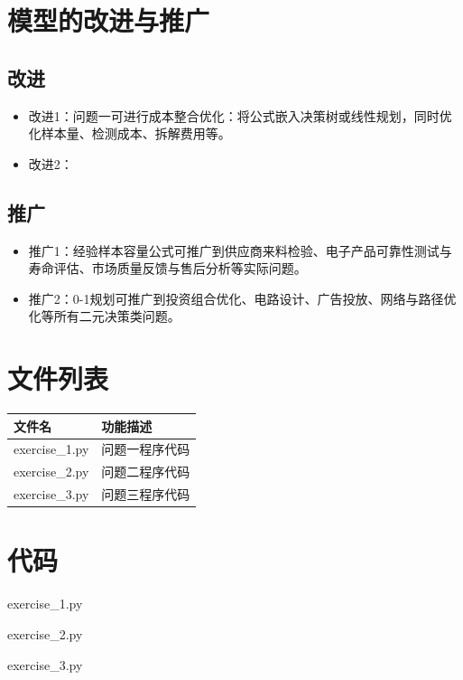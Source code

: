 \documentclass[withoutpreface,bwprint]{cumcmthesis}
\begin{document}
\section{模型的改进与推广}

\subsection{改进}
\begin{itemize}[itemindent=2em]
   \item 改进1：问题一可进行成本整合优化：将公式嵌入决策树或线性规划，同时优化样本量、检测成本、拆解费用等。
   \item 改进2：
\end{itemize}


\subsection{推广}
\begin{itemize}[itemindent=2em]
    \item 推广1：经验样本容量公式可推广到供应商来料检验、电子产品可靠性测试与寿命评估、市场质量反馈与售后分析等实际问题。
   \item 推广2：0-1规划可推广到投资组合优化、电路设计、广告投放、网络与路径优化等所有二元决策类问题。
\end{itemize}
\newpage
\nocite{*}

\newpage
\begin{appendices}
\section{文件列表}
\begin{table}[H]
\centering
\begin{tabularx}{\textwidth}{LL}
\toprule
文件名   & 功能描述 \\
\midrule
 exercise\_1.py & 问题一程序代码 \\
 exercise\_2.py & 问题二程序代码 \\
 exercise\_3.py & 问题三程序代码 \\

\bottomrule
\end{tabularx}
\label{tab:文件列表}
\end{table}

\section{代码}
\noindent 
 exercise\_1.py

exercise\_2.py

exercise\_3.py
 


\end{appendices}
\end{document}
